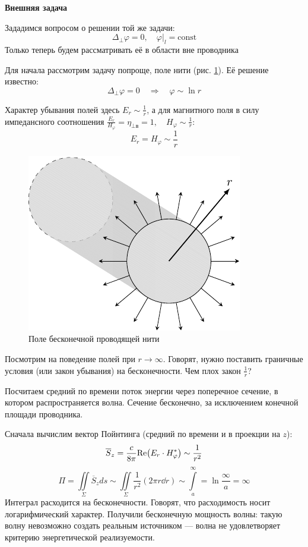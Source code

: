 \documentclass[a4paper,14pt]{extarticle}
\renewcommand{\phi}{\varphi}
\begin{document}
\textbf{Внешняя задача}

Зададимся вопросом о решении той же задачи:
\begin{equation*}
\Delta_\perp \varphi=0, \quad \varphi|_l=\mathrm{const}
\end{equation*}
Только теперь будем рассматривать её в области вне проводника

Для начала рассмотрим задачу попроще, поле нити (рис. \ref{fig:lect4:3}). Её решение известно:
\begin{equation*}
\Delta_\perp \varphi=0 
\quad \Rightarrow \quad
\varphi \sim \ln r
\end{equation*} 

Характер убывания полей здесь $\displaystyle E_r\sim \frac{1}{r}$, а для магнитного поля в силу импедансного соотношения $\displaystyle\frac{E_r}{H_\phi}=\eta_{\perp\text{в}}=1, \quad H_\varphi\sim\frac{1}{r}$:
\begin{equation*}
E_r=H_\phi\sim\frac{1}{r}
\end{equation*}
\begin{figure}[h!]
	\centering
	\includegraphics[scale=1.5]{img/lect4_ris3}
	\caption{Поле бесконечной проводящей нити}
	\label{fig:lect4:3}
\end{figure}

Посмотрим на поведение полей при $r\to\infty$. Говорят, нужно поставить граничные условия (или закон убывания) на бесконечности. Чем плох закон $\frac{1}{r}$?

Посчитаем средний по времени поток энергии через поперечное сечение, в котором распространяется волна. Сечение бесконечно, за исключением конечной площади проводника.

Сначала вычислим вектор Пойнтинга (средний по времени и в проекции на $z$):
\begin{equation*}
\overline{S}_z=\frac{c}{8 \pi}\mathrm{Re}\qty(E_r\cdot H_\phi^*)\sim\frac{1}{r^2}
\end{equation*}
\begin{equation*}
\Pi=\iint\limits_\Sigma \overline{S}_z ds \sim
\iint\limits_\Sigma \frac{1}{r^2} (2\pi r \dd{r})
\sim \int\limits_a^\infty = \ln\frac{\infty}{a}=\infty
\end{equation*}
Интеграл расходится на бесконечности. Говорят, что расходимость носит логарифмический характер. Получили бесконечную мощность волны: такую волну невозможно создать реальным источником --- волна не удовлетворяет критерию энергетической реализуемости.
\end{document}
